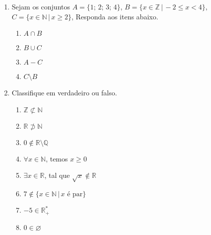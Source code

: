 \documentclass[a4paper, 12pt]{article}
\begin{document}
 
\begin{enumerate}
 \item Sejam os conjuntos $A = \{1;\, 2;\, 3;\, 4\}$, $B = \{x \in \mathbb{Z} \,|\, -2 \leq x < 4\}$, $C = \{x \in \mathbb{N} \,|\, x \geq 2\}$, Responda aos itens abaixo.
 \begin{enumerate}
  \item $A \cap B$
  \item $B \cup C$
  \item $A - C$
  \item $C \setminus B$ 
 \end{enumerate}
 
 \item Classifique em verdadeiro ou falso.
 \begin{enumerate}
  \item $\mathbb{Z} \not\subset \mathbb{N}$
  \item $\mathbb{R} \not\supset \mathbb{N}$
  \item $0 \not\in \mathbb{R}\setminus\mathbb{Q}$
  \item $\forall x \in \mathbb{N}$, temos $x \geq 0$
  \item $\exists x \in \mathbb{R}$, tal que $\sqrt{x}\not\in\mathbb{R}$
  \item $7 \not\in \{x\in \mathbb{N} \,|\, x\textrm{ é par}\}$
  \item $-5 \in \mathbb{R}^*_+$
  \item $0 \in \varnothing$
 \end{enumerate}
 
\end{enumerate}
 
\end{document}
